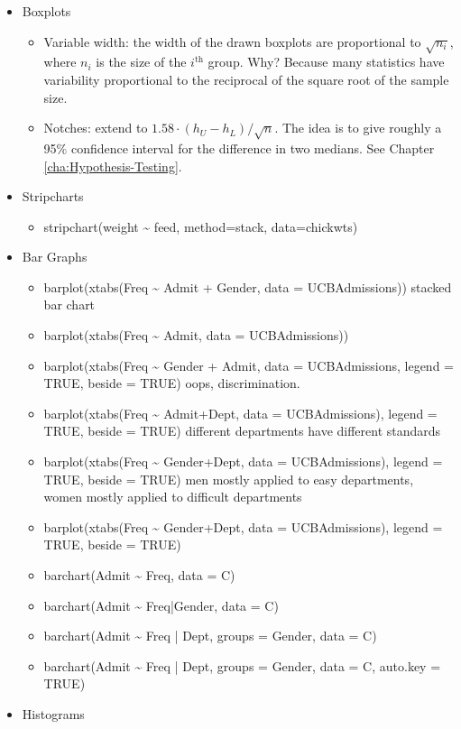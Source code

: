 \documentclass[captions=tableheading]{scrbook}
\begin{document}
\begin{itemize}
\item Boxplots
\begin{itemize}
\item Variable width: the width of the drawn boxplots are proportional to \(\sqrt{n_{i}}\), where \(n_{i}\) is the size of the \(i^{\mathrm{th}}\) group. Why? Because many statistics have variability proportional to the reciprocal of the square root of the sample size. \item Notches: extend to \(1.58\cdot(h_{U}-h_{L})/\sqrt{n}\). The idea is to give roughly a 95\% confidence interval for the difference in two medians. See Chapter \ref{cha:Hypothesis-Testing}.
\end{itemize}
\item Stripcharts
\begin{itemize}
\item stripchart(weight \~{} feed, method=\textquotedbl{}stack\textquotedbl{}, data=chickwts)
\end{itemize}
\item Bar Graphs
\begin{itemize}
\item barplot(xtabs(Freq \~{} Admit + Gender, data = UCBAdmissions)) stacked bar chart
\item barplot(xtabs(Freq \~{} Admit, data = UCBAdmissions))
\item barplot(xtabs(Freq \~{} Gender + Admit, data = UCBAdmissions, legend = TRUE, beside = TRUE)  oops, discrimination.
\item barplot(xtabs(Freq \~{} Admit+Dept, data = UCBAdmissions), legend = TRUE, beside = TRUE) different departments have different standards
\item barplot(xtabs(Freq \~{} Gender+Dept, data = UCBAdmissions), legend = TRUE, beside = TRUE) men mostly applied to easy departments, women mostly applied to difficult departments
\item barplot(xtabs(Freq \~{} Gender+Dept, data = UCBAdmissions), legend = TRUE, beside = TRUE)
\item barchart(Admit \~{} Freq, data = C)
\item barchart(Admit \~{} Freq|Gender, data = C)
\item barchart(Admit \~{} Freq | Dept, groups = Gender, data = C)
\item barchart(Admit \~{} Freq | Dept, groups = Gender, data = C, auto.key = TRUE)
\end{itemize}
\item Histograms

\end{itemize}
\end{document}
